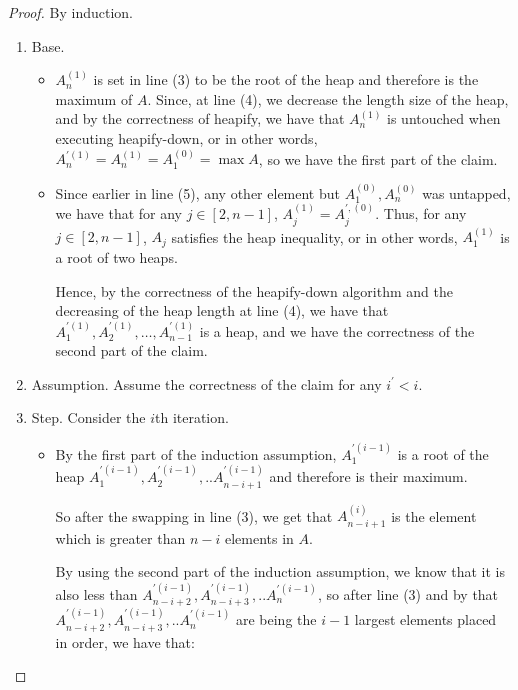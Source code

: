 \begin{proof}
By induction.
\begin{enumerate}
  \item Base. 
    \begin{itemize}
      \item $A^{(1)}_{n}$ is set in line (3) to be the root of the heap and therefore is the maximum of $A$. Since, at line (4), we decrease the length size of the heap, and by the correctness of heapify, we have that $A^{(1)}_{n}$ is untouched when executing heapify-down, or in other words, $A^{\prime (1)}_{n} = A^{(1)}_{n} = A^{(0)}_{1} = \max A$, so we have the first part of the claim.

        \item Since earlier in line (5), any other element but $A^{(0)}_{1}, A^{(0)}_{n}$ was untapped, we have that for any $j \in [2,n-1]$, $A_{j}^{(1)} = A^{\prime, (0)}_{j}$. Thus, for any $j \in [2,n-1]$, $A_{j}$ satisfies the heap inequality, or in other words, $A^{(1)}_{1}$ is a root of two heaps.

        Hence, by the correctness of the heapify-down algorithm and the decreasing of the heap length at line (4), we have that $A^{\prime (1)}_{1}, A^{\prime (1)}_{2}, \ldots, A^{\prime (1)}_{n-1}$ is a heap, and we have the correctness of the second part of the claim.
    \end{itemize}

  \item Assumption. Assume the correctness of the claim for any $i^{\prime}<i$.
  \item Step. Consider the $i$th iteration. 

    \begin{itemize}
        \item By the first part of the induction assumption, $A^{\prime (i-1)}_{1}$ is a root of the heap $A^{\prime (i-1) }_{1},A^{\prime (i-1) }_{2},..A^{\prime (i-1) }_{n-i+1}$  and therefore is their maximum.

        So after the swapping in line (3), we get that $A^{(i)}_{n-i+1}$ is the element which is greater than $n-i$ elements in $A$.

        By using the second part of the induction assumption, we know that it is also less than $A^{\prime (i-1) }_{n-i+2},A^{\prime (i-1) }_{n-i+3},..A^{\prime (i-1) }_{n}$, so after line (3) and by that $A^{\prime (i-1) }_{n-i+2},A^{\prime (i-1) }_{n-i+3},..A^{\prime (i-1) }_{n}$ are being the $i-1$ largest elements placed in order, we have that:


\end{itemize}
\end{enumerate}
\end{proof}
